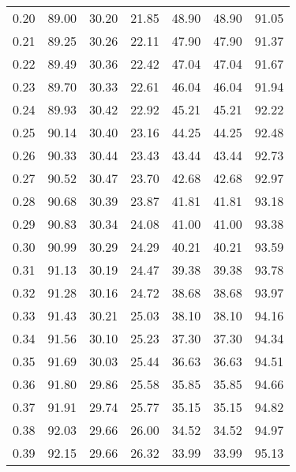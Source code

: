 \begin{tabular}{|c|c|c|c|c|c|c|}
      0.20 &     89.00 &     30.20 &      21.85 &   48.90 &      48.90 &         91.05 \\
      0.21 &     89.25 &     30.26 &      22.11 &   47.90 &      47.90 &         91.37 \\
      0.22 &     89.49 &     30.36 &      22.42 &   47.04 &      47.04 &         91.67 \\
      0.23 &     89.70 &     30.33 &      22.61 &   46.04 &      46.04 &         91.94 \\
      0.24 &     89.93 &     30.42 &      22.92 &   45.21 &      45.21 &         92.22 \\
      0.25 &     90.14 &     30.40 &      23.16 &   44.25 &      44.25 &         92.48 \\
      0.26 &     90.33 &     30.44 &      23.43 &   43.44 &      43.44 &         92.73 \\
      0.27 &     90.52 &     30.47 &      23.70 &   42.68 &      42.68 &         92.97 \\
      0.28 &     90.68 &     30.39 &      23.87 &   41.81 &      41.81 &         93.18 \\
      0.29 &     90.83 &     30.34 &      24.08 &   41.00 &      41.00 &         93.38 \\
      0.30 &     90.99 &     30.29 &      24.29 &   40.21 &      40.21 &         93.59 \\
      0.31 &     91.13 &     30.19 &      24.47 &   39.38 &      39.38 &         93.78 \\
      0.32 &     91.28 &     30.16 &      24.72 &   38.68 &      38.68 &         93.97 \\
      0.33 &     91.43 &     30.21 &      25.03 &   38.10 &      38.10 &         94.16 \\
      0.34 &     91.56 &     30.10 &      25.23 &   37.30 &      37.30 &         94.34 \\
      0.35 &     91.69 &     30.03 &      25.44 &   36.63 &      36.63 &         94.51 \\
      0.36 &     91.80 &     29.86 &      25.58 &   35.85 &      35.85 &         94.66 \\
      0.37 &     91.91 &     29.74 &      25.77 &   35.15 &      35.15 &         94.82 \\
      0.38 &     92.03 &     29.66 &      26.00 &   34.52 &      34.52 &         94.97 \\
      0.39 &     92.15 &     29.66 &      26.32 &   33.99 &      33.99 &         95.13 \\

\end{tabular}
